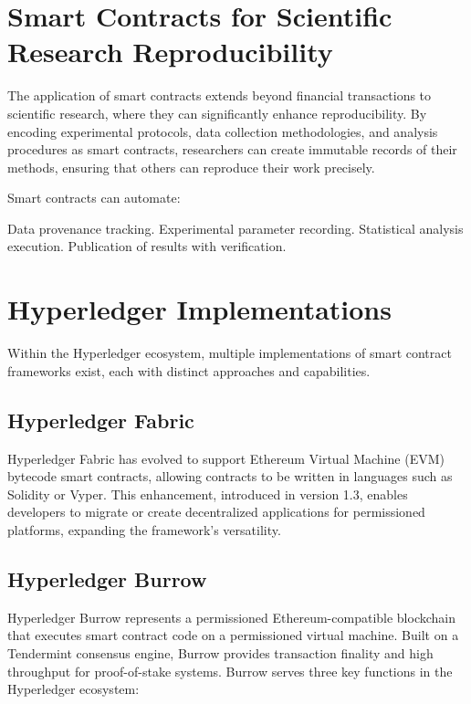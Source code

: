 \documentclass[final]{rc-book-2.14}
\begin{document}
\section{Smart Contracts for Scientific Research Reproducibility}

The application of smart contracts extends beyond financial transactions to scientific research, where they can significantly enhance reproducibility. By encoding experimental protocols, data collection methodologies, and analysis procedures as smart contracts, researchers can create immutable records of their methods, ensuring that others can reproduce their work precisely\cite{pilehchiha2022improving}.

Smart contracts can automate:

Data provenance tracking. Experimental parameter recording. Statistical analysis execution. Publication of results with verification.


\section{Hyperledger Implementations}

Within the Hyperledger ecosystem, multiple implementations of smart contract frameworks exist, each with distinct approaches and capabilities.

\subsection{Hyperledger Fabric}

Hyperledger Fabric has evolved to support Ethereum Virtual Machine (EVM) bytecode smart contracts, allowing contracts to be written in languages such as Solidity or Vyper. This enhancement, introduced in version 1.3, enables developers to migrate or create decentralized applications for permissioned platforms, expanding the framework's versatility\cite{hyperledger2018fabric}.

\subsection{Hyperledger Burrow}

Hyperledger Burrow represents a permissioned Ethereum-compatible blockchain that executes smart contract code on a permissioned virtual machine. Built on a Tendermint consensus engine, Burrow provides transaction finality and high throughput for proof-of-stake systems. Burrow serves three key functions in the Hyperledger ecosystem:
\end{document}
